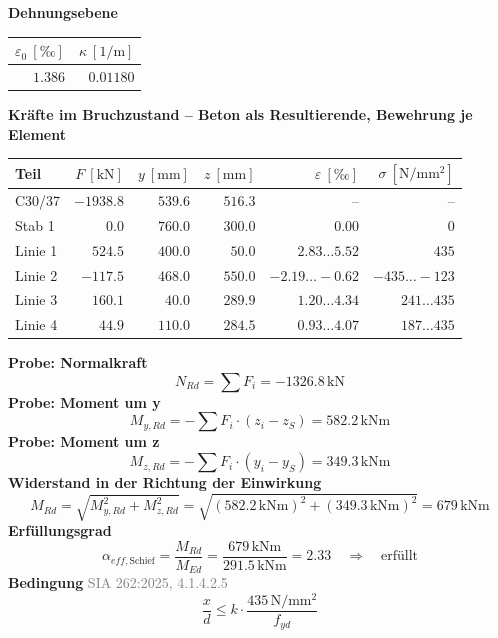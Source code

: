 \documentclass[11pt,a4paper]{article}
\newcommand{\normref}[1]{{\small\textcolor{gray}{#1}}}
\begin{document}
\noindent\textbf{Dehnungsebene}
\begin{longtable}{rr}
\hline
$\varepsilon_0\ [\text{‰}]$ & $\kappa\ [\mathrm{1/m}]$ \\
\hline
\endhead
$1.386$ & $0.01180$ \\
\hline
\end{longtable}
\noindent\textbf{Kräfte im Bruchzustand -- Beton als Resultierende, Bewehrung je Element}
\begin{longtable}{lrrrrr}
\hline
Teil & $F\ [\mathrm{kN}]$ & $y\ [\mathrm{mm}]$ & $z\ [\mathrm{mm}]$ & $\varepsilon\ [\text{‰}]$ & $\sigma\ [\mathrm{N/mm^2}]$ \\
\hline
\endhead
C30/37 & $-1938.8$ & $539.6$ & $516.3$ & – & – \\
Stab 1 & $0.0$ & $760.0$ & $300.0$ & $0.00$ & $0$ \\
Linie 1 & $524.5$ & $400.0$ & $50.0$ & $2.83 \ldots 5.52$ & $435$ \\
Linie 2 & $-117.5$ & $468.0$ & $550.0$ & $-2.19 \ldots -0.62$ & $-435 \ldots -123$ \\
Linie 3 & $160.1$ & $40.0$ & $289.9$ & $1.20 \ldots 4.34$ & $241 \ldots 435$ \\
Linie 4 & $44.9$ & $110.0$ & $284.5$ & $0.93 \ldots 4.07$ & $187 \ldots 435$ \\
\hline
\end{longtable}
\noindent\textbf{Probe: Normalkraft}
\begin{equation*}
N_{Rd} = \sum F_i = -1326.8\,\mathrm{kN}
\end{equation*}
\noindent\textbf{Probe: Moment um y}
\begin{equation*}
M_{y,Rd} = -\sum F_i \cdot (z_i - z_S) = 582.2\,\mathrm{kNm}
\end{equation*}
\noindent\textbf{Probe: Moment um z}
\begin{equation*}
M_{z,Rd} = -\sum F_i \cdot (y_i - y_S) = 349.3\,\mathrm{kNm}
\end{equation*}
\noindent\textbf{Widerstand in der Richtung der Einwirkung}
\begin{equation*}
M_{Rd} = \sqrt{M_{y,Rd}^{2} + M_{z,Rd}^{2}} = \sqrt{\left(582.2\,\mathrm{kNm}\right)^{2} + \left(349.3\,\mathrm{kNm}\right)^{2}} = 679\,\mathrm{kNm}
\end{equation*}
\noindent\textbf{Erfüllungsgrad}
\begin{equation*}
\alpha_{eff,\text{Schief}} = \frac{M_{Rd}}{M_{Ed}} = \frac{679\,\mathrm{kNm}}{291.5\,\mathrm{kNm}} = 2.33 \quad \Rightarrow \quad \text{erfüllt}
\end{equation*}
\noindent\textbf{Bedingung} \hfill \normref{SIA 262:2025, 4.1.4.2.5}
\begin{equation*}
\frac{x}{d} \le k \cdot \frac{435\,\mathrm{N/mm^2}}{f_{yd}}
\end{equation*}
\end{document}
